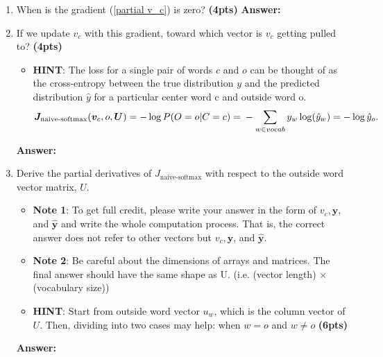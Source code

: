 \documentclass{assignment format}
\newenvironment{answer}{
    {\bf Answer:} \begingroup\color{red}
}{\endgroup}%
\begin{document}
\begin{enumerate}[label=(\alph*)]
	\item When is the gradient (\ref{partial v_c}) is zero? \textbf{(4pts)}
    \begin{answer}
    
    \end{answer}
    \item  If we update $v_c$ with this gradient, toward which vector is $v_c$ getting pulled to?  \textbf{(4pts)}
    \begin{itemize}
    \item \textbf{HINT}: The loss for a single pair of words $c$ and $o$ can be thought of as the cross-entropy between the true distribution \textbf{$y$} and the predicted distribution \textbf{$\hat{y}$} for a particular center word c and outside word o.
\begin{equation} 
\bm J_{\text{naive-softmax}}(\bm v_c, o, \bm U) = -\log P(O=o| C=c) =\\-\sum_{w \in vocab}y_w\log(\hat{y}_w)=-\log{\hat{y}_o}.
\label{naive-softmax}
\end{equation}

\end{itemize}
  \begin{answer}
    
    \end{answer}  
    \item Derive the partial derivatives of $J_{\text{naive-softmax}}$ with respect to the outside word vector matrix, $U$.
    \begin{itemize} 
\item \textbf{Note 1}: To get full credit, please write your answer in the form of $v_c, \mathbf{y}$, and $\hat{\mathbf{y}}$ and write the whole computation process. That is, the correct answer does not refer to other vectors but $v_c, \mathbf{y}$, and $\hat{\mathbf{y}}$. 
\item \textbf{Note 2}: Be careful about the dimensions of arrays and matrices. The final answer should have the same shape as U. (i.e. (vector length) $\times$ (vocabulary size)) 
\item\textbf{HINT}: Start from outside word vector $u_w$, which is the column vector of $U$. Then, dividing into two cases may help: when $w=o$ and $w \neq o$ \textbf{(6pts)}
\end{itemize}
\begin{answer}

    \end{answer}
\end{enumerate}
\end{document}
